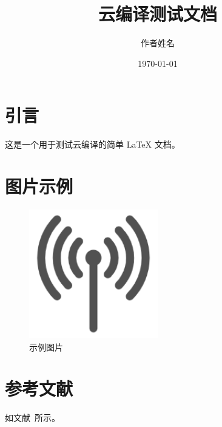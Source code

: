 \documentclass{article}
\title{云编译测试文档}
\author{作者姓名}
\date{\today}
\begin{document}
\maketitle

\section{引言}
这是一个用于测试云编译的简单 LaTeX 文档。

\section{图片示例}
\begin{figure}[h]
    \centering
    \includegraphics[width=0.5\textwidth]{figures/figure1.png}
    \caption{示例图片}
    \label{fig:example}
\end{figure}

\section{参考文献}
如文献~\cite{testref}所示。



\end{document}
